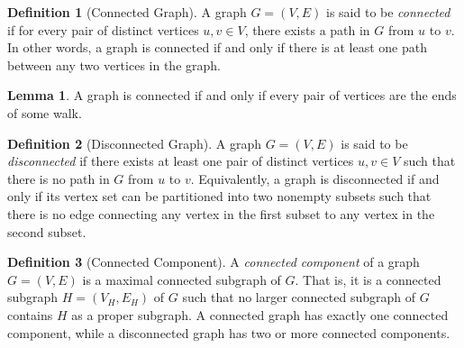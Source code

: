 \documentclass{article}
\theoremstyle{definition}
\newtheorem{lemma}{Lemma}
\newtheorem{definition}{Definition}
\begin{document}
\begin{definition}[Connected Graph]
A graph $G = (V, E)$ is said to be \textit{connected} if for every pair of distinct vertices $u, v \in V$, there exists a path in $G$ from $u$ to $v$. In other words, a graph is connected if and only if there is at least one path between any two vertices in the graph.
\end{definition}

\begin{lemma}\label{lem:walk-path}
A graph is connected if and only if every pair of vertices are the ends of some walk.
\end{lemma}

\begin{definition}[Disconnected Graph]
A graph $G = (V, E)$ is said to be \textit{disconnected} if there exists at least one pair of distinct vertices $u, v \in V$ such that there is no path in $G$ from $u$ to $v$. Equivalently, a graph is disconnected if and only if its vertex set can be partitioned into two nonempty subsets such that there is no edge connecting any vertex in the first subset to any vertex in the second subset.
\end{definition}

\begin{definition}[Connected Component]
A \textit{connected component} of a graph $G = (V, E)$ is a maximal connected subgraph of $G$. That is, it is a connected subgraph $H = (V_H, E_H)$ of $G$ such that no larger connected subgraph of $G$ contains $H$ as a proper subgraph. A connected graph has exactly one connected component, while a disconnected graph has two or more connected components.
\end{definition}
\end{document}
